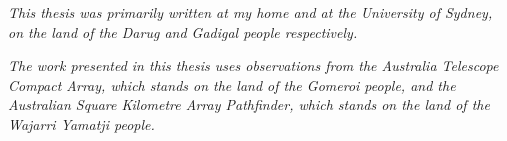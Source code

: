 \thispagestyle{empty}
\hspace{0pt}
\vfill
\begin{center}
    \textit{This thesis was primarily written at my home and at the University of Sydney, on the land of the Darug and Gadigal people respectively.}
    
    \textit{The work presented in this thesis uses observations from the Australia Telescope Compact Array, which stands on the land of the Gomeroi people, and the Australian Square Kilometre Array Pathfinder, which stands on the land of the Wajarri Yamatji people.}
\end{center}
\vfill
\hspace{0pt}